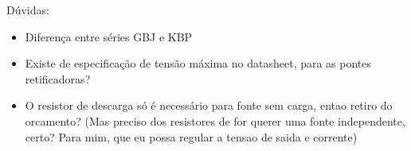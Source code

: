 \documentclass[a4paper,12pt,oneside,openany,table,xcdraw]{article}
\begin{document}
Dúvidas:%
\begin{itemize}
\item Diferença entre séries GBJ e KBP
\item Existe de especificação de tensão máxima no datasheet, para as pontes retificadoras?
\item O resistor de descarga só é necessário para fonte sem carga, entao retiro do orcamento? (Mas preciso dos resistores de for querer uma fonte independente, certo? Para mim, que eu possa regular a tensao de saida e corrente) 
\end{itemize}

\begin{table}[H]
\def\arraystretch{1.28}
\centering
\caption{Componentes e orçamento da fonte.}
\label{fonte:componentes}
\end{table}
\end{document}
